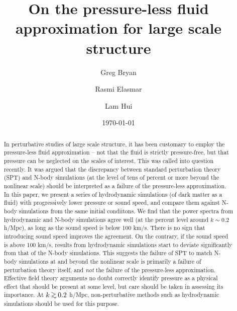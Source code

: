 \documentclass[aps,showpacs,twocolumn,floats,prd,superscriptaddress,nofootinbib]{revtex4}
\def\gsim{\raise 0.4ex\hbox{$>$}\kern -0.7em\lower 0.62ex\hbox{$\sim$}}
\begin{document}
\title{On the pressure-less fluid approximation for large scale structure}
\author{Greg Bryan}
\author{Rasmi Elasmar}
\author{Lam Hui}
\date{\today}


\begin{abstract}
In perturbative studies of large scale structure, it has been customary to employ the
pressure-less fluid approximation -- not that the fluid is strictly
pressure-free, but that pressure can be neglected on the scales of interest.
This was called into question recently. 
It was argued that the discrepancy between standard perturbation 
theory (SPT) and N-body simulations (at the level of tens of percent or more beyond the nonlinear scale) 
should be interpreted as a failure of the pressure-less approximation.
In this paper, we present a series of hydrodynamic simulations (of dark matter as a fluid)
with progressively lower pressure or sound speed, and 
compare them against N-body simulations from the same initial condiitons.
We find that the power spectra from hydrodynamic and N-body simulations agree well
(at the percent level around $k \sim 0.2$ h/Mpc), as long as the sound speed is below 100 km/s.
There is no sign that introducing sound speed improves the agreement. 
On the contrary, if the sound speed is above 100 km/s, results from
hydrodynamic simulations start to deviate significantly from that of the N-body simulations.
This suggests the failure of SPT to match N-body simulations at and beyond the nonlinear scale
is primarily a failure of perturbation theory itself, and {\it not} the failure of the pressure-less approximation.
Effective field theory arguments no doubt correctly
identify pressure as a physical effect that should be present at some level,
but care should be taken in assessing its importance.
At $k \, \gsim \, 0.2$ h/Mpc, non-perturbative methods such as
hydrodynamic simulations should be used for this purpose.
\end{abstract}
\end{document}
